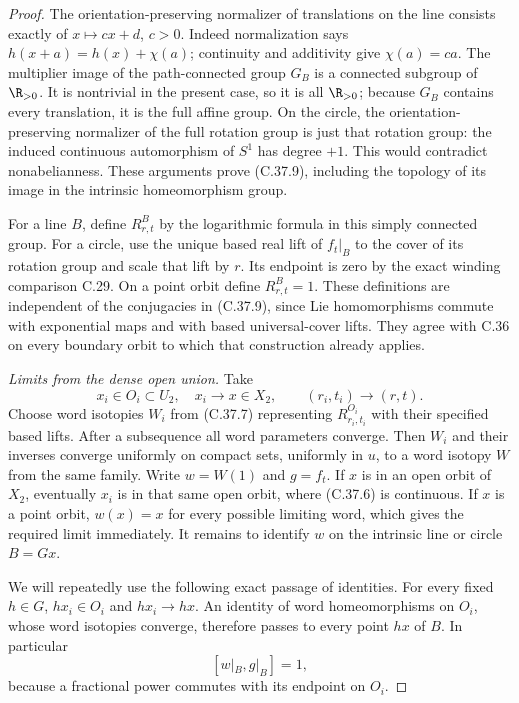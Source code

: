 \begin{proof}
The orientation-preserving normalizer of translations on
the line consists exactly of $x\mapsto cx+d$, $c>0$.
Indeed normalization says $h(x+a)=h(x)+\chi(a)$;
continuity and additivity give $\chi(a)=ca$.
The multiplier image of the path-connected group $G_B$
is a connected subgroup of $\R_{>0}$. It is nontrivial in
the present case, so it is all $\R_{>0}$; because $G_B$
contains every translation, it is the full affine group.
On the circle, the orientation-preserving normalizer of
the full rotation group is just that rotation group:
the induced continuous automorphism of $S^1$ has degree
$+1$. This would contradict nonabelianness. These
arguments prove (C.37.9), including the topology of its
image in the intrinsic homeomorphism group.

For a line $B$, define $R^B_{r,t}$ by the logarithmic formula
in this simply connected group. For a circle, use the
unique based real lift of $f_t|_B$ to the cover of its
rotation group and scale that lift by $r$.
Its endpoint is zero by the exact winding comparison C.29.
On a point orbit define $R^B_{r,t}=1$.
These definitions are independent of the conjugacies in
(C.37.9), since Lie homomorphisms commute with exponential
maps and with based universal-cover lifts.
They agree with C.36 on every boundary orbit to which
that construction already applies.

\emph{Limits from the dense open union.}
Take
\[
 x_i\in O_i\subset U_2,\quad x_i\longrightarrow x\in X_2,
 \qquad (r_i,t_i)\longrightarrow(r,t).
                                                        \tag{C.37.10}
\]
Choose word isotopies $W_i$ from (C.37.7) representing
$R^{O_i}_{r_i,t_i}$ with their specified based lifts.
After a subsequence all word parameters converge.
Then $W_i$ and their inverses converge uniformly on compact
sets, uniformly in $u$, to a word isotopy $W$ from the
same family. Write $w=W(1)$ and $g=f_t$.
If $x$ is in an open orbit of $X_2$, eventually $x_i$ is
in that same open orbit, where (C.37.6) is continuous.
If $x$ is a point orbit, $w(x)=x$ for every possible
limiting word, which gives the required limit immediately.
It remains to identify $w$ on the intrinsic line or circle
$B=Gx$.

We will repeatedly use the following exact passage of
identities. For every fixed $h\in G$,
$hx_i\in O_i$ and $hx_i\to hx$. An identity of word
homeomorphisms on $O_i$, whose word isotopies converge,
therefore passes to every point $hx$ of $B$.
In particular
\[
                        [w|_B,g|_B]=1,                 \tag{C.37.11}
\]
because a fractional power commutes with its endpoint
on $O_i$.


\end{proof}
